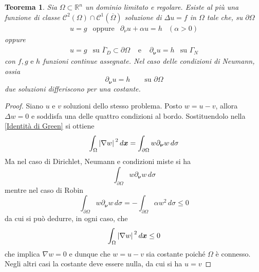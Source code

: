 \documentclass[a4paper,12pt, draft]{article}
\theoremstyle{break}
\newtheorem{theorem}{Teorema}[section]
\numberwithin{equation}{section}
\begin{document}
\begin{theorem}
  Sia \(\Omega \subset \mathbb{R}^n\) un dominio limitato e regolare. Esiste al più una funzione di classe \(\mathcal{C}^2(\Omega)\cap\mathcal{C}^1(\overline{\Omega})\) soluzione di \(\Delta u = f\) in \(\Omega\) tale che, su \(\partial\Omega\)
  \[
  \begin{array}{cccc}
    u = g & \mbox{oppure} & \partial_{\nu}u +\alpha u = h & (\alpha > 0)
  \end{array}  
  \]
  oppure 
  \[
  \begin{array}{ccccc}
    u=g & \mbox{su }\overline{\Gamma}_D\subset \partial\Omega & \mbox{ e } & \partial_{\bm{\nu}}u = h & \mbox{su }\Gamma_N
  \end{array}  
  \]
  con \(f, g \mbox{ e } h\) funzioni continue assegnate. Nel caso delle condizioni di Neumann, ossia
  \[
    \partial_{\bm{\nu}}u = h \qquad \mbox{su }\partial\Omega
  \]
  due soluzioni differiscono per una costante.
\end{theorem}
\begin{proof}
  Siano \(u\) e \(v\) soluzioni dello stesso problema. Posto \(w = u-v\), allora \(\Delta w = 0\) e soddisfa una delle quattro condizioni al bordo. Sostituendolo nella \eqref{Identità di Green} si ottiene
  \[
    \int_{\Omega} \abs*{\nabla w}^2 \, d\bm{x} = \int_{\partial\Omega} w\partial_{\bm{\nu}} w\, d\sigma
  \]
  Ma nel caso di Dirichlet, Neumann e condizioni miste si ha
  \[
   \int_{\partial\Omega} w\partial_{\bm{\nu}} w \, d\sigma 
  \]
  mentre nel caso di Robin 
  \[
  \int_{\partial\Omega} w\partial_{\bm{\nu}}  w \, d\sigma = -\int_{\partial\Omega} \alpha w^2 \, d\sigma \leq 0
  \]
  da cui si può dedurre, in ogni caso, che 
  \[
    \int_{\Omega}\abs*{\nabla w}^2 \, d\bm{x} \leq 0
  \]
  che implica \(\nabla w = 0\) e dunque che \(w = u-v\) sia costante poiché \(\Omega\) è connesso. Negli altri casi la costante deve essere nulla, da cui si ha \(u = v\)
\end{proof}
\end{document}
